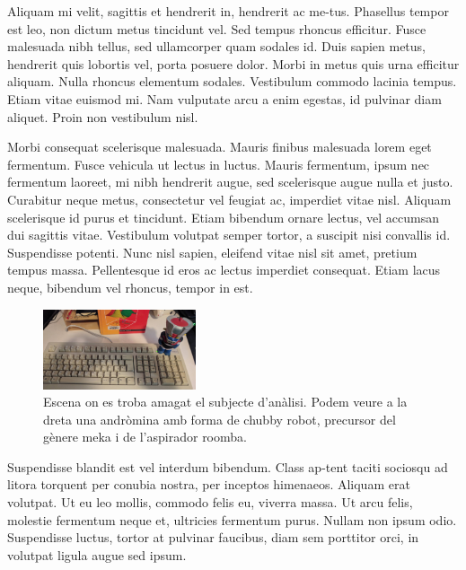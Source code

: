﻿\documentclass[10pt,a4paper,twocolumn,twoside]{article}
\begin{document}
Aliquam mi velit, sagittis et hendrerit in, hendrerit ac me-tus. Phasellus tempor est leo, non dictum metus tincidunt vel. Sed tempus rhoncus efficitur. Fusce malesuada nibh tellus, sed ullamcorper quam sodales id. Duis sapien metus, hendrerit quis lobortis vel, porta posuere dolor. Morbi in metus quis urna efficitur aliquam. Nulla rhoncus elementum sodales. Vestibulum commodo lacinia tempus. Etiam vitae euismod mi. Nam vulputate arcu a enim egestas, id pulvinar diam aliquet. Proin non vestibulum nisl.

Morbi consequat scelerisque malesuada. Mauris finibus malesuada lorem eget fermentum. Fusce vehicula ut lectus in luctus. Mauris fermentum, ipsum nec fermentum laoreet, mi nibh hendrerit augue, sed scelerisque augue nulla et justo. Curabitur neque metus, consectetur vel feugiat ac, imperdiet vitae nisl. Aliquam scelerisque id purus et tincidunt. Etiam bibendum ornare lectus, vel accumsan dui sagittis vitae. Vestibulum volutpat semper tortor, a suscipit nisi convallis id. Suspendisse potenti. Nunc nisl sapien, eleifend vitae nisl sit amet, pretium tempus massa. Pellentesque id eros ac lectus imperdiet consequat. Etiam lacus neque, bibendum vel rhoncus, tempor in est. 

\begin{figure}[!h]
\centering
	\includegraphics[width=0.4\textwidth]{figs/Fig1.jpg}
	\caption{Escena on es troba amagat el subjecte d’anàlisi. Podem veure a la dreta una andròmina amb forma de chubby robot, precursor del gènere meka i de l’aspirador roomba.}
	\label{f:vistageneral}
\end{figure}

Suspendisse blandit est vel interdum bibendum. Class ap-tent taciti sociosqu ad litora torquent per conubia nostra, per inceptos himenaeos. Aliquam erat volutpat. Ut eu leo mollis, commodo felis eu, viverra massa. Ut arcu felis, molestie fermentum neque et, ultricies fermentum purus. Nullam non ipsum odio. Suspendisse luctus, tortor at pulvinar faucibus, diam sem porttitor orci, in volutpat ligula augue sed ipsum.
\end{document}

